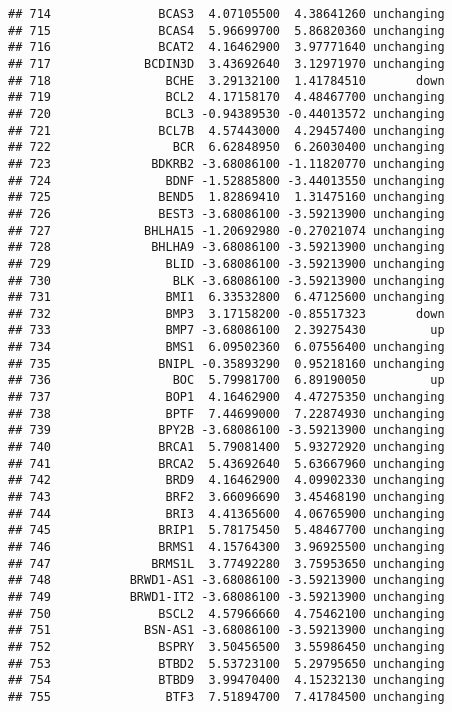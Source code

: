 \documentclass[]{article}
\begin{document}
\begin{verbatim}
## 714               BCAS3  4.07105500  4.38641260 unchanging
## 715               BCAS4  5.96699700  5.86820360 unchanging
## 716               BCAT2  4.16462900  3.97771640 unchanging
## 717             BCDIN3D  3.43692640  3.12971970 unchanging
## 718                BCHE  3.29132100  1.41784510       down
## 719                BCL2  4.17158170  4.48467700 unchanging
## 720                BCL3 -0.94389530 -0.44013572 unchanging
## 721               BCL7B  4.57443000  4.29457400 unchanging
## 722                 BCR  6.62848950  6.26030400 unchanging
## 723              BDKRB2 -3.68086100 -1.11820770 unchanging
## 724                BDNF -1.52885800 -3.44013550 unchanging
## 725               BEND5  1.82869410  1.31475160 unchanging
## 726               BEST3 -3.68086100 -3.59213900 unchanging
## 727             BHLHA15 -1.20692980 -0.27021074 unchanging
## 728              BHLHA9 -3.68086100 -3.59213900 unchanging
## 729                BLID -3.68086100 -3.59213900 unchanging
## 730                 BLK -3.68086100 -3.59213900 unchanging
## 731                BMI1  6.33532800  6.47125600 unchanging
## 732                BMP3  3.17158200 -0.85517323       down
## 733                BMP7 -3.68086100  2.39275430         up
## 734                BMS1  6.09502360  6.07556400 unchanging
## 735               BNIPL -0.35893290  0.95218160 unchanging
## 736                 BOC  5.79981700  6.89190050         up
## 737                BOP1  4.16462900  4.47275350 unchanging
## 738                BPTF  7.44699000  7.22874930 unchanging
## 739               BPY2B -3.68086100 -3.59213900 unchanging
## 740               BRCA1  5.79081400  5.93272920 unchanging
## 741               BRCA2  5.43692640  5.63667960 unchanging
## 742                BRD9  4.16462900  4.09902330 unchanging
## 743                BRF2  3.66096690  3.45468190 unchanging
## 744                BRI3  4.41365600  4.06765900 unchanging
## 745               BRIP1  5.78175450  5.48467700 unchanging
## 746               BRMS1  4.15764300  3.96925500 unchanging
## 747              BRMS1L  3.77492280  3.75953650 unchanging
## 748           BRWD1-AS1 -3.68086100 -3.59213900 unchanging
## 749           BRWD1-IT2 -3.68086100 -3.59213900 unchanging
## 750               BSCL2  4.57966660  4.75462100 unchanging
## 751             BSN-AS1 -3.68086100 -3.59213900 unchanging
## 752               BSPRY  3.50456500  3.55986450 unchanging
## 753               BTBD2  5.53723100  5.29795650 unchanging
## 754               BTBD9  3.99470400  4.15232130 unchanging
## 755                BTF3  7.51894700  7.41784500 unchanging

\end{verbatim}
\end{document}
